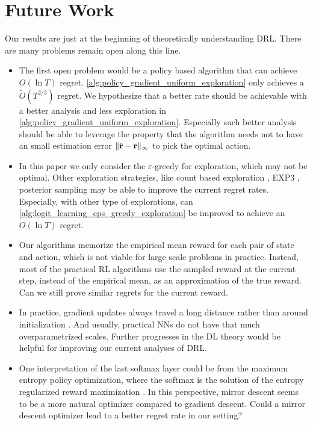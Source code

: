 \section{Future Work}
\label{sec:future_work}

Our results are just at the beginning of theoretically understanding DRL. There are many problems remain open along this line.
\begin{itemize}
    \item The first open problem would be a policy based algorithm that can achieve $O(\ln T)$ regret. \cref{alg:policy_gradient_uniform_exploration} only achieves a $\tilde{O}(T^{2/3})$ regret. We hypothesize that a better rate should be achievable with a better analysis and less exploration in \cref{alg:policy_gradient_uniform_exploration}. 
    Especially such better analysis should be able to leverage the property that the algorithm needs not to have an small estimation error $\|\hat{{\mathbf{r}}} - {\mathbf{r}}\|_\infty$ to pick the optimal action.
    \item In this paper we only consider the $\varepsilon$-greedy for exploration, which may not be optimal. Other exploration strategies, like count based exploration \cite{auer2002finite}, EXP3 \citep{seldin2014one}, posterior sampling \citep{agrawal2012analysis} 
    may be able to improve the current regret rates. Especially, with other type of explorations, can \cref{alg:logit_learning_eps_greedy_exploration} be improved to achieve an $O(\ln T)$ regret.
    \item Our algorithms memorize the empirical mean reward for each pair of state and action, which is not viable for large scale problems in practice. Instead, most of the practical RL algorithms use the sampled reward at the current step, instead of the empirical mean, as an approximation of the true reward. Can we still prove similar regrets for the current reward.
    \item In practice, gradient updates always travel a long distance rather than around initialization \citep{liu2018deeptracker}. And usually, practical NNs do not have that much overparametrized scales. Further progresses in the DL theory would be helpful for improving our current analyses of DRL.
    \item One interpretation of the last softmax layer could be from the maximum entropy policy optimization, where the softmax is the solution of the entropy regularized reward maximization \cite{nachum2017bridging}. In this perspective, mirror descent seems to be a more natural optimizer compared to gradient descent. Could a mirror descent optimizer lead to a better regret rate in our setting?

\end{itemize}
